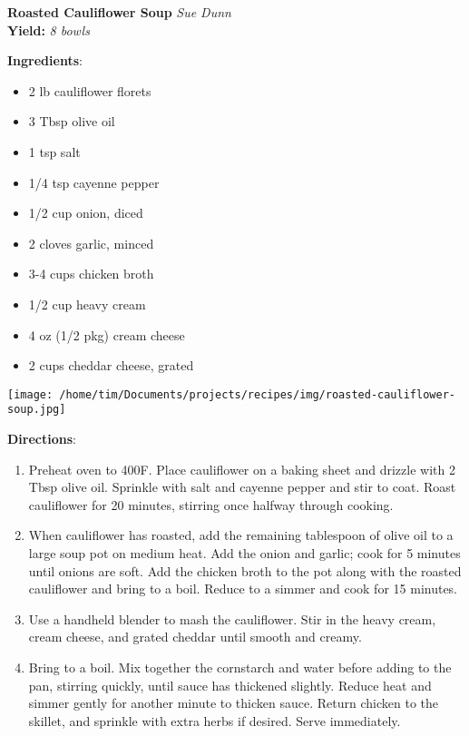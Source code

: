 \documentclass[11pt, twoside, openany]{book}
\begin{document}
\noindent\begin{minipage}[t]{\linewidth}%
{\Large\textbf{Roasted Cauliflower Soup}} \label{roasted-cauliflower-soup}\hfill\textit{Sue Dunn}\\
\textbf{Yield:} \textit{8 bowls}\\
\noindent\begin{minipage}[t]{0.78\linewidth}%
\textbf{Ingredients}:\vspace{-3mm}
\begin{multicols}{2}
\begin{itemize}\setlength\itemsep{-1mm}
\item 2 lb cauliflower florets
\item 3 Tbsp olive oil
\item 1 tsp salt
\item 1/4 tsp cayenne pepper
\item 1/2 cup onion, diced
\item 2 cloves garlic, minced
\item 3-4 cups chicken broth
\item 1/2 cup heavy cream
\item 4 oz (1/2 pkg) cream cheese
\item 2 cups cheddar cheese, grated
\end{itemize}
\end{multicols}
\end{minipage}
\noindent\begin{minipage}[t]{0.18\linewidth}
\centering \strut\vspace*{-\baselineskip}\newline
\texttt{[image: /home/tim/Documents/projects/recipes/img/roasted-cauliflower-soup.jpg]}\\
\end{minipage}\vspace{3mm}
\textbf{Directions}:
\vspace{-3mm}\begin{enumerate}\setlength\itemsep{-1mm}
\item Preheat oven to 400F. Place cauliflower on a baking sheet and drizzle with 2 Tbsp olive oil. Sprinkle with salt and cayenne pepper and stir to coat. Roast cauliflower for 20 minutes, stirring once halfway through cooking.
\item When cauliflower has roasted, add the remaining tablespoon of olive oil to a large soup pot on medium heat. Add the onion and garlic; cook for 5 minutes until onions are soft. Add the chicken broth to the pot along with the roasted cauliflower and bring to a boil. Reduce to a simmer and cook for 15 minutes.
\item Use a handheld blender to mash the cauliflower. Stir in the heavy cream, cream cheese, and grated cheddar until smooth and creamy.
\item Bring to a boil. Mix together the cornstarch and water before adding to the pan, stirring quickly, until sauce has thickened slightly. Reduce heat and simmer gently for another minute to thicken sauce. Return chicken to the skillet, and sprinkle with extra herbs if desired. Serve immediately.
\end{enumerate}
\end{minipage}\vspace{8mm}
\end{document}
